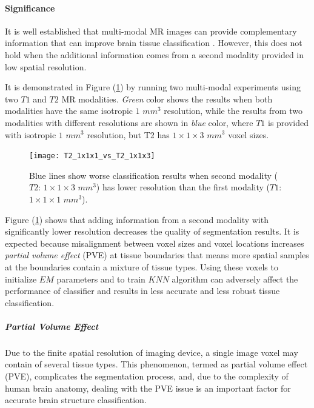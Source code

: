 \paragraph{Significance}

It is well established that multi-modal MR images can provide complementary information that can improve brain tissue classification \cite{Kim2013}.
However, this does not hold when the additional information comes from a second modality provided in low spatial resolution.

It is demonstrated in Figure (\ref{T2_1x1x1_vs_T2_1x1x3}) by running two multi-modal experiments using two $T1$ and $T2$ MR modalities. \textit{Green} color shows the results when both modalities have the same isotropic $1$ $mm^3$ resolution, while the results from two modalities with different resolutions are shown in \textit{blue} color, where $T1$ is provided with isotropic $1$ $mm^3$ resolution, but T2 has $1 \times 1 \times 3$ $mm^3$ voxel sizes.

\begin{figure}
\centering
\texttt{[image: T2\_1x1x1\_vs\_T2\_1x1x3]}\
\centering
\caption{Blue lines show worse classification results when second modality ($T2$: $1 \times 1 \times 3$ $mm^3$) has lower resolution than the first modality ($T1$: $1 \times 1 \times 1$ $mm^3$).}
\label{T2_1x1x1_vs_T2_1x1x3}
\end{figure}

Figure (\ref{T2_1x1x1_vs_T2_1x1x3}) shows that adding information from a second modality with significantly lower resolution decreases the quality of segmentation results.
It is expected because misalignment between voxel sizes and voxel locations increases \textit{partial volume effect} (PVE) at tissue boundaries that means more spatial samples at the boundaries contain a mixture of tissue types. Using these voxels to initialize $EM$ parameters and to train $KNN$ algorithm can adversely affect the performance of classifier and results in less accurate and less robust tissue classification.

\subparagraph{Partial Volume Effect}

Due to the finite spatial resolution of imaging device, a single image voxel may contain of several tissue types. This phenomenon, termed as partial volume effect (PVE), complicates the segmentation process, and, due to the complexity of human brain anatomy, dealing with the PVE issue is an important factor for accurate brain structure classification.

